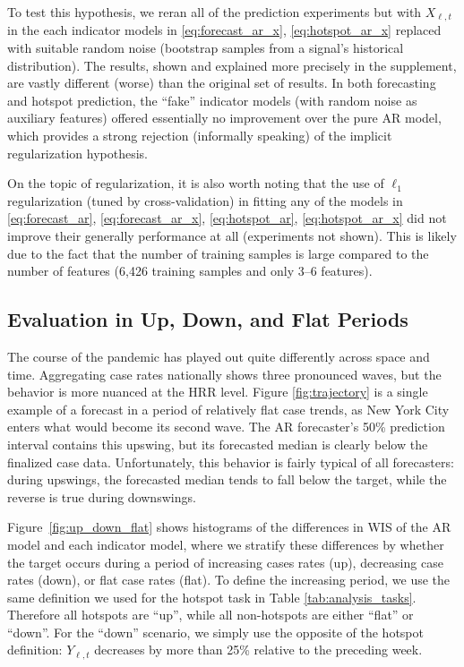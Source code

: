 \documentclass[9pt,twocolumn,twoside,lineno]{pnas-new}
\begin{document}
To test this hypothesis, we reran all of the prediction experiments but with
$X_{\ell,t}$ in the each indicator models in \eqref{eq:forecast_ar_x},
\eqref{eq:hotspot_ar_x} replaced with suitable random noise (bootstrap samples
from a signal's historical distribution).  The results, shown and explained more
precisely in the supplement, are vastly different (worse) than the original set
of results.  In both forecasting and hotspot prediction, the ``fake'' indicator
models (with random noise as auxiliary features) offered essentially no
improvement over the pure AR model, which provides a strong rejection
(informally speaking) of the implicit regularization hypothesis.     

On the topic of regularization, it is also worth noting that the use of 
$\ell_1$ regularization (tuned by cross-validation) in fitting any of the models
in \eqref{eq:forecast_ar}, \eqref{eq:forecast_ar_x}, \eqref{eq:hotspot_ar}, 
\eqref{eq:hotspot_ar_x} did not improve their generally performance at all
(experiments not shown).  This is likely due to the fact that the number of
training samples is large compared to the number of features (6,426 training
samples and only 3--6 features).   


\subsection{Evaluation in Up, Down, and Flat Periods}

The course of the pandemic has played out quite differently across space and
time. Aggregating case rates nationally shows three pronounced waves, but the
behavior is more nuanced at the HRR level.  Figure \ref{fig:trajectory} is a
single example of a forecast in a period of relatively flat case trends, as New
York City enters what would become its second wave. The AR forecaster's 50\%
prediction interval contains this upswing, but its forecasted median is clearly
below the finalized case data.  Unfortunately, this behavior is fairly typical
of all forecasters: during upswings, the forecasted median tends to fall below 
the target, while the reverse is true during downswings.

Figure~\ref{fig:up_down_flat} shows histograms of the differences in WIS of the 
AR model and each indicator model, where we stratify these differences by
whether the target occurs during a period of increasing cases rates (up),
decreasing case rates (down), or flat case rates (flat). To define the
increasing period, we use the same definition we used for the hotspot task in
Table \ref{tab:analysis_tasks}.  Therefore all hotspots are ``up'', while all
non-hotspots are either ``flat'' or ``down''.  For the ``down'' scenario, we 
simply use the opposite of the hotspot definition: $Y_{\ell,t}$ decreases by
more than 25\% relative to the preceding week.  
\end{document}
